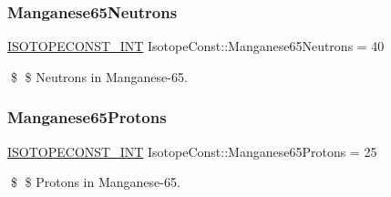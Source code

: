 \subsubsection{\texorpdfstring{Manganese65\+Neutrons}{Manganese65Neutrons}}
{\footnotesize\ttfamily \mbox{\hyperlink{group___isotope_const-_macros_ga5f18360b3e99483a35c32d789e62621c}{I\+S\+O\+T\+O\+P\+E\+C\+O\+N\+S\+T\+\_\+\+I\+NT}} Isotope\+Const\+::\+Manganese65\+Neutrons = 40}

\$ \$ Neutrons in Manganese-\/65. \mbox{\label{group___isotope_const-_manganese-_mn65_ga3992a89c4d10f271c0f776741bf978fe}} 
\subsubsection{\texorpdfstring{Manganese65\+Protons}{Manganese65Protons}}
{\footnotesize\ttfamily \mbox{\hyperlink{group___isotope_const-_macros_ga5f18360b3e99483a35c32d789e62621c}{I\+S\+O\+T\+O\+P\+E\+C\+O\+N\+S\+T\+\_\+\+I\+NT}} Isotope\+Const\+::\+Manganese65\+Protons = 25}

\$ \$ Protons in Manganese-\/65. 